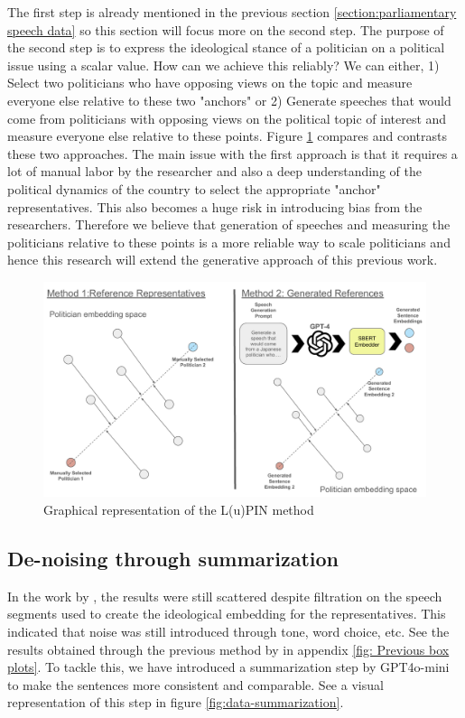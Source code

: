 \documentclass[final,5p,times,twocolumn,authoryear]{elsarticle}
\begin{document}
The first step is already mentioned in the previous section \ref{section:parliamentary speech data} so this section will focus more on the second step. The purpose of the second step is to express the ideological stance of a politician on a political issue using a scalar value. How can we achieve this reliably? We can either, 1) Select two politicians who have opposing views on the topic and measure everyone else relative to these two "anchors" or 2) Generate speeches that would come from politicians with opposing views on the political topic of interest and measure everyone else relative to these points. Figure \ref{fig:lupin-projection} compares and contrasts these two approaches. The main issue with the first approach is that it requires a lot of manual labor by the researcher and also a deep understanding of the political dynamics of the country to select the appropriate "anchor" representatives. This also becomes a huge risk in introducing bias from the researchers. Therefore we believe that generation of speeches and measuring the politicians relative to these points is a more reliable way to scale politicians and hence this research will extend the generative approach of this previous work.



\begin{figure}[h]
\centering
  \centering
  \includegraphics[width=1\linewidth]{figs/projectionphase.pdf}
  \caption{Graphical representation of the L(u)PIN method \citep{kato2024lupinllmbasedpoliticalideology}}
  \label{fig:lupin-projection}
\end{figure}

\subsection{De-noising through summarization}
\label{section: denoising}
In the work by \citeauthor{kato2024lupinllmbasedpoliticalideology}, the results were still scattered despite filtration on the speech segments used to create the ideological embedding for the representatives. This indicated that noise was still introduced through tone, word choice, etc. See the results obtained through the previous method by \citeauthor{kato2024lupinllmbasedpoliticalideology} in appendix \ref{fig: Previous box plots}. To tackle this, we have introduced a summarization step by GPT4o-mini to make the sentences more consistent and comparable. See a visual representation of this step in figure \ref{fig:data-summarization}. 
\end{document}
